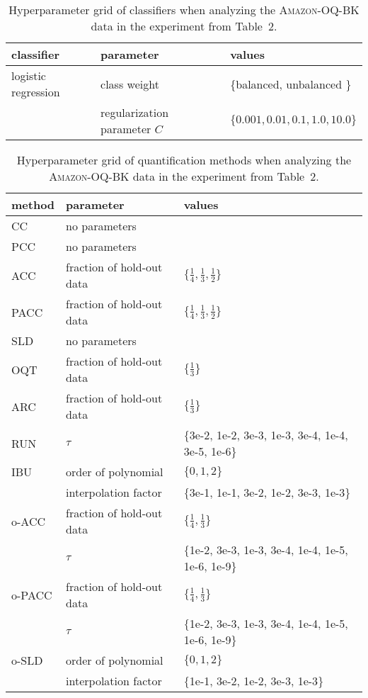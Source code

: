 \documentclass[10pt,a4paper]{article}
\begin{document}
\begin{table}
 \centering
 \caption{Hyperparameter grid of classifiers when analyzing the
 \textsc{Amazon-OQ-BK} data in the experiment from Table~2.}
 \label{tab:hyperparameter-roberta-classifier}
 \footnotesize
 \begin{tabular}{lll}
 \toprule
 classifier & parameter & values \\
 \midrule
 logistic regression & class weight & \{balanced, unbalanced \} \\
 & regularization parameter $C$ & $\{0.001, 0.01, 0.1, 1.0, 10.0\}$ \\
 \bottomrule
 \end{tabular}
\end{table}

\begin{table}
 \centering
 \caption{Hyperparameter grid of quantification methods when
 analyzing the \textsc{Amazon-OQ-BK} data in the experiment from
 Table~2.}
 \label{tab:hyperparameter-roberta-quantifier}
 \footnotesize
 \begin{tabular}{lll}
 \toprule
 method & parameter & values \\
 \midrule
 CC & no parameters & \\
 PCC & no parameters & \\
 ACC & fraction of hold-out data & $\{\frac{1}{4}, \frac{1}{3}, \frac{1}{2}\}$ \\
 PACC & fraction of hold-out data & $\{\frac{1}{4}, \frac{1}{3}, \frac{1}{2}\}$ \\
 SLD & no parameters & \\
 \midrule
 OQT & fraction of hold-out data & $\{\frac{1}{3}\}$ \\
 ARC & fraction of hold-out data & $\{\frac{1}{3}\}$ \\
 RUN & $\tau$ & $\{$3e-2, 1e-2, 3e-3, 1e-3, 3e-4, 1e-4, 3e-5, 1e-6$\}$ \\
 IBU & order of polynomial & $\{0, 1, 2\}$ \\
 & interpolation factor & $\{$3e-1, 1e-1, 3e-2, 1e-2, 3e-3, 1e-3$\}$ \\
 \midrule
 o-ACC & fraction of hold-out data & $\{\frac{1}{4}, \frac{1}{3}\}$ \\
 & $\tau$ & $\{$1e-2, 3e-3, 1e-3, 3e-4, 1e-4, 1e-5, 1e-6, 1e-9$\}$ \\
 o-PACC & fraction of hold-out data & $\{\frac{1}{4}, \frac{1}{3}\}$ \\
 & $\tau$ & $\{$1e-2, 3e-3, 1e-3, 3e-4, 1e-4, 1e-5, 1e-6, 1e-9$\}$ \\
 o-SLD & order of polynomial & $\{0, 1, 2\}$ \\
 & interpolation factor & $\{$1e-1, 3e-2, 1e-2, 3e-3, 1e-3$\}$ \\
 \bottomrule
 \end{tabular}
\end{table}
\end{document}
